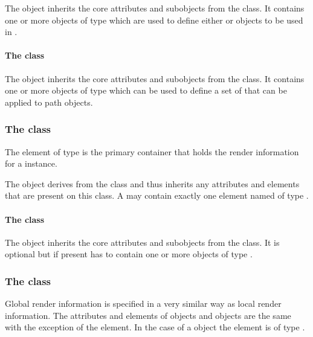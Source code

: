 The \ListOfGradientDefinitions object inherits the core attributes and subobjects from the 
class. It contains one or more objects of type \GradientBase which are used to define either \LinearGradient or \RadialGradient objects to be used in \Styles. 

\paragraph{The  class}
\label{listoflineendings-class}

The \ListOfLineEndings object
inherits the core attributes and subobjects from the 
class. It contains one or more objects of type \LineEnding which can be used to define a set of \LineEndings that can be applied to path objects.


\subsubsection{The  class}
\label{localrenderinformation-class}
The \RenderInformation element of type \LocalRenderInformation is the primary 
container that holds the render information for a  instance. 


The \LocalRenderInformation object derives from the
\RenderInformationBase class and thus inherits any attributes and
elements that are present on this class.
A \LocalRenderInformation may contain exactly one element named  
of type \ListOfLocalStyles.

\paragraph{The  class}
\label{listoflocalstyles-class}

The \ListOfLocalStyles object inherits
the core attributes and subobjects from the  class. It is optional but 
if present has to contain one or more objects of type \LocalStyle.


\subsubsection{The  class}
\label{globalrenderinformation-class}

Global render information is specified in a very similar way as local render information. The attributes and elements of \GlobalRenderInformation objects and 
\LocalRenderInformation objects are the same with the exception of the  element. In the case of a \GlobalRenderInformation object the  element is of type \ListOfGlobalStyles.

